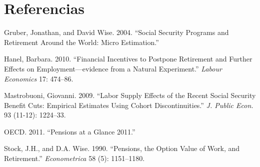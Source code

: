 \documentclass[]{article}
\begin{document}
\section*{Referencias}\label{referencias}

\hypertarget{refs}{}
\hypertarget{ref-gruber04}{}
Gruber, Jonathan, and David Wise. 2004. ``Social Security Programs and
Retirement Around the World: Micro Estimation.''

\hypertarget{ref-hanel09}{}
Hanel, Barbara. 2010. ``Financial Incentives to Postpone Retirement and
Further Effects on Employment---evidence from a Natural Experiment.''
\emph{Labour Economics} 17: 474--86.

\hypertarget{ref-mastrobouni09}{}
Mastrobuoni, Giovanni. 2009. ``Labor Supply Effects of the Recent Social
Security Benefit Cuts: Empirical Estimates Using Cohort
Discontinuities.'' \emph{J. Public Econ.} 93 (11-12): 1224--33.

\hypertarget{ref-ocde11}{}
OECD. 2011. ``Pensions at a Glance 2011.''

\hypertarget{ref-stock90}{}
Stock, J.H., and D.A. Wise. 1990. ``Pensions, the Option Value of Work,
and Retirement.'' \emph{Econometrica} 58 (5): 1151--1180.
\end{document}
